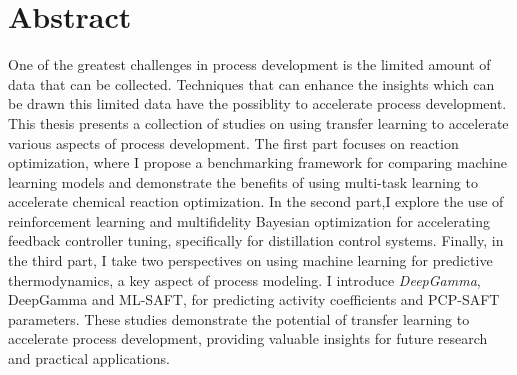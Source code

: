 \begingroup
\let\clearpage\relax
\let\cleardoublepage\relax
\let\cleardoublepage\relax

\chapter*{Abstract}

One of the greatest challenges in process development is the limited amount of data that can be collected. Techniques that can enhance the insights which can be drawn this limited data have the possiblity to accelerate process development. This thesis presents a collection of studies on using transfer learning to accelerate various aspects of process development. The first part focuses on reaction optimization, where I propose a benchmarking framework for comparing machine learning models and demonstrate the benefits of using multi-task learning to accelerate chemical reaction optimization. In the second part,I explore the use of reinforcement learning and multifidelity Bayesian optimization for accelerating feedback controller tuning, specifically for distillation control systems. Finally, in the third part, I take two perspectives on using machine learning for predictive thermodynamics, a key aspect of process modeling. I introduce \textit{DeepGamma}, DeepGamma and ML-SAFT, for predicting activity coefficients and PCP-SAFT parameters. These studies demonstrate the potential of transfer learning to accelerate process development, providing valuable insights for future research and practical applications.

\vfill

\endgroup			

\vfill